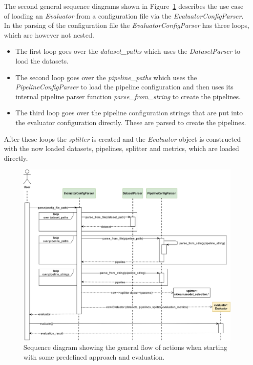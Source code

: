 The second general sequence diagrams shown in Figure~\ref{fig:interfaces-general_sequence_diagram_with_config} describes the use case of loading an \textit{Evaluator} from a configuration file via the \textit{EvaluatorConfigParser}.
In the parsing of the configuration file the \textit{EvaluatorConfigParser} has three loops, which are however not nested.
\begin{itemize}
    \item The first loop goes over the \textit{dataset\_paths} which uses the \textit{DatasetParser} to load the datasets.
    \item The second loop goes over the \textit{pipeline\_paths} which uses the \textit{PipelineConfigParser} to load the pipeline configuration and then uses its internal pipeline parser function \textit{parse\_from\_string} to create the pipelines.
    \item The third loop goes over the pipeline configuration strings that are put into the evaluator configuration directly. These are parsed to create the pipelines.
\end{itemize}
After these loops the \textit{splitter} is created and the \textit{Evaluator} object is constructed with the now loaded datasets, pipelines, splitter and metrics, which are loaded directly.
\begin{figure}[ht]
    \centering
    \includegraphics[width=\textwidth]{gfx/general_sequence _diagram_config}
    \caption{Sequence diagram showing the general flow of actions when starting with some predefined approach and evaluation.}
    \label{fig:interfaces-general_sequence_diagram_with_config}
\end{figure}

